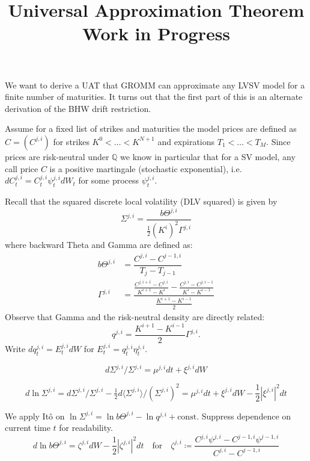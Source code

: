 \documentclass[11pt]{article}
\title{Universal Approximation Theorem\\{Work in Progress}}
\author{}
\newcommand{\Q}{\mathbb Q}
\newcommand{\qv}[1]{\langle #1\rangle}
\theoremstyle{plain}
\theoremstyle{definition}
\theoremstyle{remark}
\begin{document}
\maketitle

We want to derive a UAT that GROMM can approximate any LVSV model for a finite number of maturities. It turns out that the first part of this is an alternate derivation of the BHW drift restriction. 

Assume for a fixed list of strikes and maturities the model prices are defined as $C = (C^{j, i})$ for strikes $K^0 < \dots < K^{N+1}$ and expirations $T_1 < \dots < T_M$. Since prices are risk-neutral under $\Q$ we know in particular that for a SV model, any call price $C$ is a positive martingale (stochastic exponential), i.e. $d C^{j, i}_t = C^{j, i}_t\psi^{j, i}_tdW_t $ for some process $\psi^{j, i}_t$. 

Recall that the squared discrete local volatility (DLV squared) is given by 
\begin{equation*}
    \Sigma^{j, i} = \dfrac{b\Theta^{j, i}}{\frac{1}{2}(K^{i})^2\Gamma^{j, i}}
\end{equation*}
where backward Theta and Gamma are defined as: 
\begin{align*}
    b\Theta^{j, i} &= \dfrac{C^{j, i} - C^{j-1, i}}{T_{j} - T_{j-1}}
    \\
    \Gamma^{j, i} &= \dfrac{\frac{C^{j, i + 1} - C^{j, i}}{K^{i+1} - K^i} - \frac{C^{j, i} - C^{j, i-1}}{K^{i} - K^{i-1}}}{\frac{K^{i+1} - K^{i-1}}{2}}
\end{align*}
Observe that Gamma and the risk-neutral density are directly related: 
\begin{equation*}
    q^{j, i} = \frac{K^{i+1} - K^{i-1}}{2} \Gamma^{j, i}. 
\end{equation*}
Write $dq^{j, i}_t = E^{j, i}_t dW $ for $E^{j, i}_t = q^{j, i}_t \eta^{j, i}_t$. 


\begin{equation*}
    d \Sigma^{j, i} / \Sigma^{j, i} = \mu^{j, i} dt + \xi^{j, i} dW 
\end{equation*}

\begin{equation}
    \label{eq:dlnDLV}
    d \ln \Sigma^{j, i} = d \Sigma^{j, i} / \Sigma^{j, i} - \tfrac{1}{2}  d \qv{\Sigma^{j, i}} / (\Sigma^{j, i})^2 = \mu^{j, i} dt + \xi^{j, i} dW - \frac{1}{2} |\xi^{j, i}|^2 dt 
\end{equation}


We apply Itô on $\ln \Sigma^{j, i} = \ln b \Theta^{j, i} - \ln q^{j, i} + \text{const}$. Suppress dependence on current time $t$ for readability. 
\begin{equation*}
    d \ln b \Theta^{j, i} =  \zeta^{j, i} dW - \frac{1}{2} |\zeta^{j, i}|^2 dt  \quad \textrm{for} \quad \zeta^{j, i} \coloneqq \dfrac{C^{j, i}\psi^{j, i} - C^{j-1, i} \psi^{j-1, i}}{C^{j, i} - C^{j-1, i}}
\end{equation*}
\end{document}
